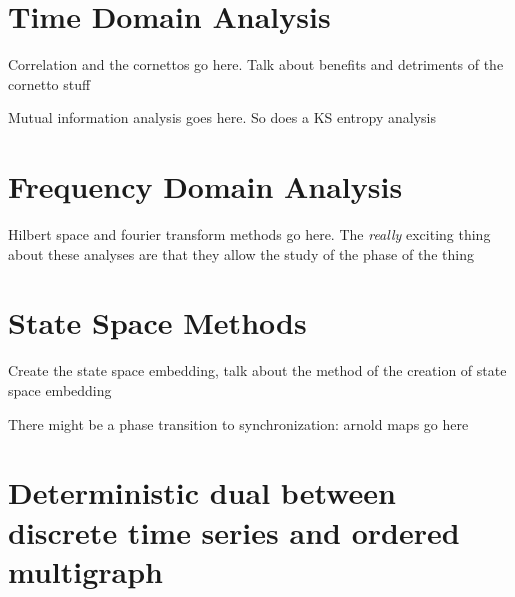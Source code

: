 \documentclass[12pt]{article}
\begin{document}

\section{Time Domain Analysis}



Correlation and the cornettos go here. Talk about benefits and detriments of the cornetto stuff


Mutual information analysis goes here. So does a KS entropy analysis

\section{Frequency Domain Analysis}
Hilbert space and fourier transform methods go here. The \emph{really} exciting thing about these analyses are that they allow the study of the phase of the thing


\section{State Space Methods}

Create the state space embedding, talk about the method of the creation of state space embedding

There might be a phase transition to synchronization: arnold maps go here

\section{Deterministic dual between discrete time series and ordered multigraph}
\end{document}
